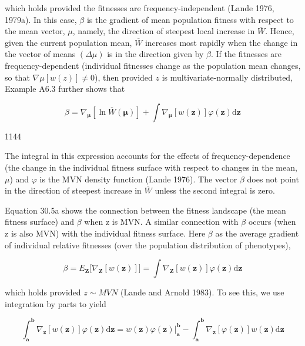 \documentclass{article}
\begin{document}
which holds provided the fitnesses are frequency-independent (Lande 1976, 1979a). In this case,  $ \beta $ is the gradient of mean population fitness with respect to the mean vector,  $ \mu $, namely, the direction of steepest local increase in  $ \overline{W} $. Hence, given the current population mean,  $ \overline{W} $ increases most rapidly when the change in the vector of means  $ (\Delta\mu) $ is in the direction given by  $ \beta $. If the fitnesses are frequency-dependent (individual fitnesses change as the population mean changes, so that  $ \nabla\mu[w(z)] \neq 0 $), then provided  $ z $ is multivariate-normally distributed, Example A6.3 further shows that

\begin{equation}
\beta=\nabla_{\boldsymbol{\mu}}[\ln\overline{W}(\boldsymbol{\mu})]+\int\nabla_{\boldsymbol{\mu}}[w(\mathbf{z})]\varphi(\mathbf{z})\mathrm{d}\mathbf{z}
\tag{30.5b}
\label{eq:30_5b}
\end{equation}

1144

The integral in this expression accounts for the effects of frequency-dependence (the change in the individual fitness surface with respect to changes in the mean,  $ \mu $) and  $ \varphi $ is the MVN density function (Lande 1976). The vector  $ \beta $ does not point in the direction of steepest increase in  $ \overline{W} $ unless the second integral is zero.

Equation 30.5a shows the connection between the fitness landscape (the mean fitness surface) and  $ \beta $ when z is MVN. A similar connection with  $ \beta $ occurs (when z is also MVN) with the individual fitness surface. Here  $ \beta $ as the average gradient of individual relative fitnesses (over the population distribution of phenotypes),

\begin{equation}
\beta=E_{\mathbf{Z}}\bigg[\nabla_{\mathbf{Z}}[w(\mathbf{z})]\bigg]=\int\nabla_{\mathbf{Z}}[w(\mathbf{z})]\varphi(\mathbf{z})\mathrm{d}\mathbf{z}
\tag{30.6}
\label{eq:30_6}
\end{equation}

which holds provided  $ z \sim MVN $ (Lande and Arnold 1983). To see this, we use integration by parts to yield

\begin{equation}
\int_{\mathbf{a}}^{\mathbf{b}}\nabla_{\mathbf{z}}[w(\mathbf{z})]\varphi(\mathbf{z})\mathrm{d}\mathbf{z}=w(\mathbf{z})\varphi(\mathbf{z})\bigg|_{\mathbf{a}}^{\mathbf{b}}-\int_{\mathbf{a}}^{\mathbf{b}}\nabla_{\mathbf{z}}[\varphi(\mathbf{z})]w(\mathbf{z})\mathrm{d}\mathbf{z}
\end{equation}
\end{document}
